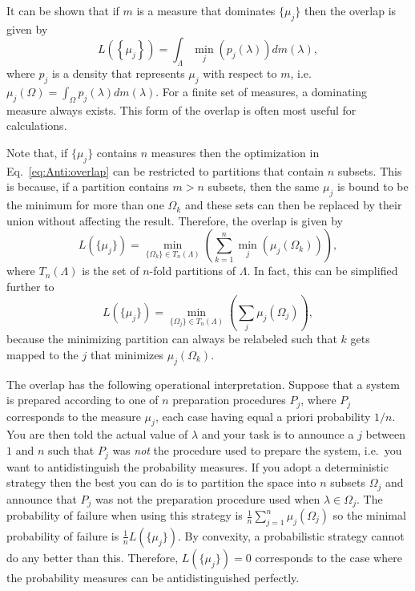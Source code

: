 \documentclass[DIV=calc,paper=a4,fontsize=11pt,twocolumn]{scrartcl} %
\theoremstyle{definition}
\theoremstyle{plain}
\begin{document}
It can be shown that if $m$ is a measure that dominates $\{\mu_j\}$
then the overlap is given by
\begin{equation}
\label{eq:Anti:domform}
L \left ( \left \{ \mu_j \right \}\right ) = \int_{\Lambda} \min_j
\left (p_j(\lambda) \right ) dm(\lambda),
\end{equation}
where $p_j$ is a density that represents $\mu_j$ with respect to $m$,
i.e. $\mu_j(\Omega) = \int_{\Omega} p_j(\lambda)dm(\lambda)$.  For a
finite set of measures, a dominating measure always exists.  This form
of the overlap is often most useful for calculations.

Note that, if $\{\mu_j\}$ contains $n$ measures then the optimization
in Eq.~\eqref{eq:Anti:overlap} can be restricted to partitions that
contain $n$ subsets.  This is because, if a partition contains $m > n$
subsets, then the same $\mu_j$ is bound to be the minimum for more
than one $\Omega_k$ and these sets can then be replaced by their union
without affecting the result.  Therefore, the overlap is given by
\begin{equation}
L(\{\mu_j\}) = \min_{\{\Omega_k\} \in T_n(\Lambda)} \left ( \sum_{k=1}^n
\min_j \left ( \mu_j(\Omega_k) \right ) \right ),
\end{equation}
where $T_n(\Lambda)$ is the set of $n$-fold partitions of $\Lambda$.
In fact, this can be simplified further to
\begin{equation}
\label{eq:Anti:npart}
L(\{\mu_j\}) = \min_{\{\Omega_j\} \in T_n(\Lambda)} \left ( \sum_j
\mu_j(\Omega_j) \right ),
\end{equation}
because the minimizing partition can always be relabeled such that
$k$ gets mapped to the $j$ that minimizes $\mu_j(\Omega_k)$.

The overlap has the following operational interpretation.  Suppose
that a system is prepared according to one of $n$ preparation
procedures $P_j$, where $P_j$ corresponds to the measure $\mu_j$, each
case having equal a priori probability $1/n$.  You are then told the
actual value of $\lambda$ and your task is to announce a $j$ between
$1$ and $n$ such that $P_j$ was \emph{not} the procedure used to
prepare the system, i.e.\ you want to antidistinguish the probability
measures.  If you adopt a deterministic strategy then the best you can
do is to partition the space into $n$ subsets $\Omega_j$ and announce
that $P_j$ was not the preparation procedure used when $\lambda \in
\Omega_j$.  The probability of failure when using this strategy is
$\frac{1}{n} \sum_{j=1}^n \mu_j(\Omega_j)$ so the minimal probability
of failure is $\frac{1}{n} L(\{\mu_j\})$.  By convexity, a
probabilistic strategy cannot do any better than this.  Therefore,
$L(\{\mu_j\}) = 0$ corresponds to the case where the probability
measures can be antidistinguished perfectly.
\end{document}
